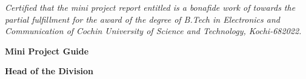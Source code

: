 \vspace*{1.2cm}
\begin{center}
	\thispagestyle{empty}
	\vspace{1cm}
	\par
	\vspace{1cm}
\end{center}
\vspace{.3cm}
\textit{Certified that the mini project report entitled  is a bonafide work of  towards the partial fulfillment for the award of the degree of B.Tech in Electronics and Communication of Cochin University of Science and Technology, Kochi-682022.
}
\begin{center}
	\vspace{3cm}
	\begin{minipage}[t]{.4\linewidth}
		\begin{flushleft}
			\textbf{Mini Project Guide}\\
		\end{flushleft}
	\end{minipage}%
	\hfill%
	\begin{minipage}[t]{.4\linewidth}%
		\begin{flushright}
			\textbf{Head of the Division}\\
		\end{flushright}
	\end{minipage}
\end{center}
\vspace*{\fill}
